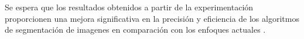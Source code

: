 Se espera que los resultados obtenidos a partir de la experimentación proporcionen una mejora significativa en la precisión y eficiencia de los algoritmos de segmentación de imagenes en comparación con los enfoques actuales \cite{einstein}.
